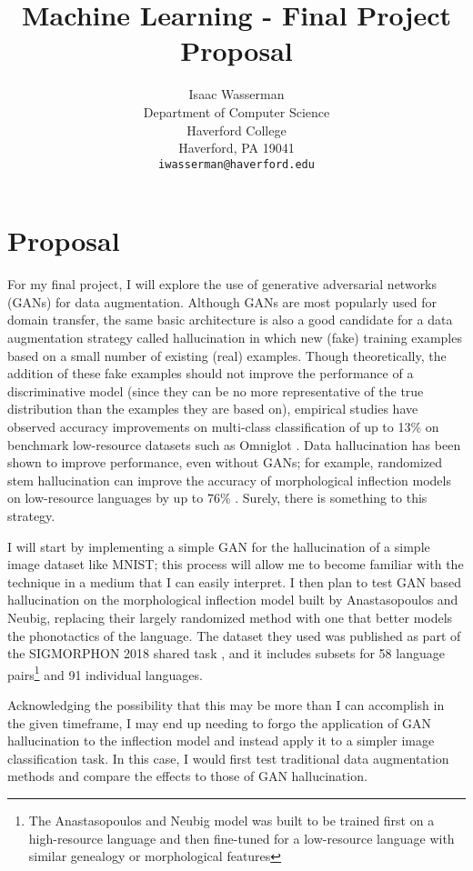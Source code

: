 \documentclass{article}
\title{Machine Learning - Final Project Proposal}
\author{%
  Isaac Wasserman\\
  Department of Computer Science\\
  Haverford College\\
  Haverford, PA 19041\\
  \texttt{iwasserman@haverford.edu} \\
}
\begin{document}
  \maketitle

  \section{Proposal}
  For my final project, I will explore the use of generative adversarial networks (GANs) for data augmentation. Although GANs are most popularly used for domain transfer, the same basic architecture is also a good candidate for a data augmentation strategy called hallucination in which new (fake) training examples based on a small number of existing (real) examples. Though theoretically, the addition of these fake examples should not improve the performance of a discriminative model (since they can be no more representative of the true distribution than the examples they are based on), empirical studies have observed accuracy improvements on multi-class classification of up to 13\% on benchmark low-resource datasets such as Omniglot \cite{antoniou}. Data hallucination has been shown to improve performance, even without GANs; for example, randomized stem hallucination can improve the accuracy of morphological inflection models on low-resource languages by up to 76\% \cite{anastasopoulos-neubig-2019-pushing}. Surely, there is something to this strategy.

  I will start by implementing a simple GAN for the hallucination of a simple image dataset like MNIST; this process will allow me to become familiar with the technique in a medium that I can easily interpret. I then plan to test GAN based hallucination on the morphological inflection model built by Anastasopoulos and Neubig, replacing their largely randomized method with one that better models the phonotactics of the language. The dataset they used was published as part of the SIGMORPHON 2018 shared task \cite{sigmorphon}, and it includes subsets for 58 language pairs\footnote{The Anastasopoulos and Neubig model was built to be trained first on a high-resource language and then fine-tuned for a low-resource language with similar genealogy or morphological features} and 91 individual languages.

  Acknowledging the possibility that this may be more than I can accomplish in the given timeframe, I may end up needing to forgo the application of GAN hallucination to the inflection model and instead apply it to a simpler image classification task. In this case, I would first test traditional data augmentation methods and compare the effects to those of GAN hallucination.
\end{document}
